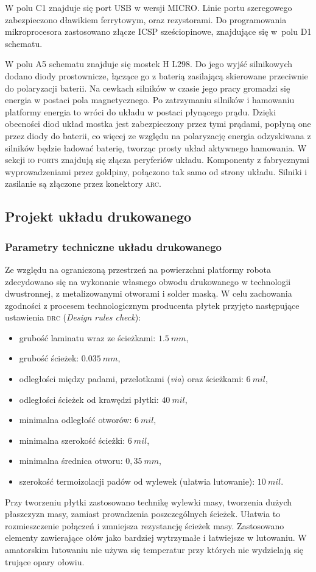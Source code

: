 \documentclass[11pt]{article}
\begin{document}
W polu C1 znajduje się port USB w wersji MICRO. Linie portu szeregowego zabezpieczono dławikiem ferrytowym, oraz rezystorami.
Do programowania mikroprocesora zastosowano złącze ICSP sześciopinowe, znajdujące się w~polu D1 schematu.

W polu A5 schematu znajduje się mostek H L298.
Do jego wyjść silnikowych dodano diody prostownicze, łączące go z baterią zasilającą skierowane przeciwnie do polaryzacji baterii.
Na cewkach silników w czasie jego pracy gromadzi się energia w postaci pola magnetycznego.
Po zatrzymaniu silników i hamowaniu platformy energia to wróci do układu w postaci płynącego prądu.
Dzięki obecności diod układ mostka jest zabezpieczony przez tymi prądami, popłyną one przez diody do baterii, co więcej ze względu na polaryzację energia odzyskiwana z silników będzie ładować baterię, tworząc prosty układ aktywnego hamowania.
W sekcji \textsc{io ports} znajdują się złącza peryferiów układu.
Komponenty z fabrycznymi wyprowadzeniami przez goldpiny, połączono tak samo od strony układu.
Silniki i zasilanie są złączone przez konektory \textsc{arc}.


\subsection{Projekt układu drukowanego}
\subsubsection{Parametry techniczne układu drukowanego}
Ze względu na ograniczoną przestrzeń na powierzchni platformy robota zdecydowano się na wykonanie własnego obwodu drukowanego w technologii dwustronnej, z metalizowanymi otworami i solder maską.
W celu zachowania zgodności z procesem technologicznym producenta płytek %
przyjęto następujące ustawienia \textsc{drc} (\textit{Design rules check}):
\begin{itemize}
	\item grubość laminatu wraz ze ścieżkami: $ 1.5\ mm $,
	\item grubość ścieżek: $ 0.035\ mm $,
	\item odległości między padami, przelotkami (\textit{via}) oraz ścieżkami: $ 6\ mil $,
	\item odległości ścieżek od krawędzi płytki: $ 40\ mil $,
	\item minimalna odległość otworów: $ 6\ mil $,
	\item minimalna szerokość ścieżki: $ 6\ mil $,
	\item minimalna średnica otworu: $ 0,35\ mm $,
	\item szerokość termoizolacji padów od wylewek (ułatwia lutowanie): $ 10\ mil $.
\end{itemize}
Przy tworzeniu płytki zastosowano technikę wylewki masy, tworzenia dużych płaszczyzn masy, zamiast prowadzenia poszczególnych ścieżek.
Ułatwia to rozmieszczenie połączeń i zmniejsza rezystancję ścieżek masy.
Zastosowano elementy zawierające ołów jako bardziej wytrzymałe i łatwiejsze w lutowaniu.
W amatorskim lutowaniu nie używa się temperatur przy których nie wydzielają się trujące opary ołowiu.
\end{document}
